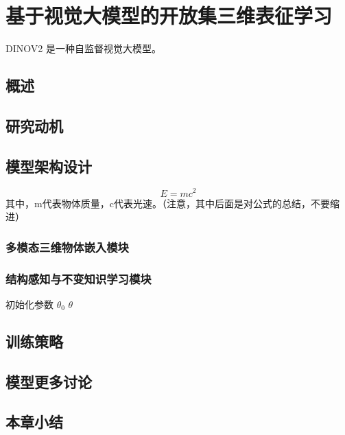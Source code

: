 \section{基于视觉大模型的开放集三维表征学习}
DINOV2 是一种自监督视觉大模型\parencite{ref5,ref6}。
\subsection{概述}

\subsection{研究动机}

\subsection{模型架构设计}

\begin{equation}
E = mc^2
\end{equation} 
其中，m代表物体质量，c代表光速。（注意，其中后面是对公式的总结，不要缩进）

\subsubsection{多模态三维物体嵌入模块}

\subsubsection{结构感知与不变知识学习模块}

\begin{algorithm}[H]
  \caption{示例算法（实际使用时替换为论文中的算法）}
  \label{alg:demo}
  初始化参数 $\theta_0$\;
  \Return $\theta$\;
\end{algorithm}

\subsection{训练策略}

\subsection{模型更多讨论}

\subsection{本章小结}
